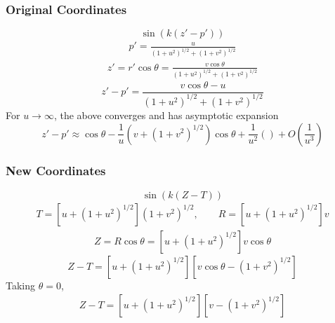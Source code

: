 \documentclass[10pt,letterpaper]{article}
\begin{document}
\subsubsection*{Original Coordinates}
\begin{equation}
\sin(k(z'-p'))
\end{equation}
\begin{align}
p' =\frac{ u}{(1+u^2)^{1/2}+(1+v^2)^{1/2}}
\end{align}
\begin{align}
z' = r'\cos\theta = \frac{v\cos\theta}{(1+u^2)^{1/2}+(1+v^2)^{1/2}}
\end{align}
\begin{equation}
z'-p' = \frac{v\cos\theta - u}{(1+u^2)^{1/2}+(1+v^2)^{1/2}}
\end{equation}
For $u \to \infty$, the above converges and has asymptotic expansion
\begin{equation}
z'-p' \approx \cos\theta - \frac{1}{u}(v+(1+v^2)^{1/2})\cos\theta + \frac{1}{u^2}() +  O\left( \frac{1}{u^3}\right)
\end{equation}
\subsubsection*{New Coordinates}
\begin{equation}
\sin(k(Z-T)) 
\end{equation}
\begin{align}
T = \left[u+(1+u^2)^{1/2}\right]( 1+v^2)^{1/2},\qquad R = \left[u+(1+u^2)^{1/2}\right]v
\end{align}
\begin{align}
Z = R\cos\theta = \left[u+(1+u^2)^{1/2}\right]v\cos\theta
\end{align}
\begin{equation}
Z-T = \left[u+(1+u^2)^{1/2}\right]\left[v\cos\theta - ( 1+v^2)^{1/2}\right]
\end{equation}
Taking $\theta = 0$, 
\begin{align}
Z-T = \left[u+(1+u^2)^{1/2}\right]\left[v - ( 1+v^2)^{1/2}\right]
\end{align}
\end{document}
